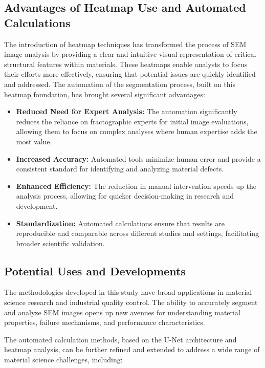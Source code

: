 \documentclass[preprint,12pt]{elsarticle}
\begin{document}
\subsection{Advantages of Heatmap Use and Automated Calculations}
The introduction of heatmap techniques has transformed the process of SEM image analysis by providing a clear and intuitive visual representation of critical structural features within materials. These heatmaps enable analysts to focus their efforts more effectively, ensuring that potential issues are quickly identified and addressed. The automation of the segmentation process, built on this heatmap foundation, has brought several significant advantages:
\begin{itemize}
    \item \textbf{Reduced Need for Expert Analysis:} The automation significantly reduces the reliance on fractographic experts for initial image evaluations, allowing them to focus on complex analyses where human expertise adds the most value.
    \item \textbf{Increased Accuracy:} Automated tools minimize human error and provide a consistent standard for identifying and analyzing material defects.
    \item \textbf{Enhanced Efficiency:} The reduction in manual intervention speeds up the analysis process, allowing for quicker decision-making in research and development.
    \item \textbf{Standardization:} Automated calculations ensure that results are reproducible and comparable across different studies and settings, facilitating broader scientific validation.
\end{itemize}


\subsection{Potential Uses and Developments}

The methodologies developed in this study have broad applications in material science research and industrial quality control. The ability to accurately segment and analyze SEM images opens up new avenues for understanding material properties, failure mechanisms, and performance characteristics.

The automated calculation methods, based on the U-Net architecture and heatmap analysis, can be further refined and extended to address a wide range of material science challenges, including:
\end{document}

